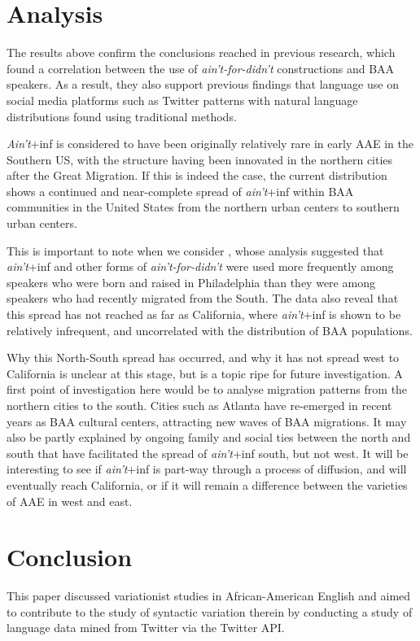 \documentclass[output=paper,colorlinks,citecolor=brown,draftmode]{langscibook}
\begin{document}
\section{Analysis}
The results above confirm the conclusions reached in previous research, which found a correlation between the use of \textit{ain’t-for-didn’t} constructions and BAA speakers. As a result, they also support previous findings \citep{eisenstein2013,jones2015,willis2020} that language use on social media platforms such as Twitter patterns with natural language distributions found using traditional methods.

\textit{Ain't}+inf is considered to have been originally relatively rare in early AAE in the Southern US, with the structure having been innovated in the northern cities after the Great Migration. If this is indeed the case, the current distribution shows a continued and near-complete spread of \textit{ain't}+inf within BAA communities in the United States from the northern urban centers to southern urban centers. 

This is important to note when we consider \citet{fisher2022}, whose analysis suggested that \textit{ain't}+inf and other forms of \textit{ain't-for-didn’t} were used more frequently among speakers who were born and raised in Philadelphia than they were among speakers who had recently migrated from the South. The data also reveal that this spread has not reached as far as California, where \textit{ain't}+inf is shown to be relatively infrequent, and uncorrelated with the distribution of BAA populations.

Why this North-South spread has occurred, and why it has not spread west to California is unclear at this stage, but is a topic ripe for future investigation. A first point of investigation here would be to analyse migration patterns from the northern cities to the south. Cities such as Atlanta have re-emerged in recent years as BAA cultural centers, attracting new waves of BAA migrations. It may also be partly explained by ongoing family and social ties between the north and south that have facilitated the spread of \textit{ain't}+inf south, but not west. It will be interesting to see if \textit{ain't}+inf is part-way through a process of diffusion, and will eventually reach California, or if it will remain a difference between the varieties of AAE in west and east.


\section{Conclusion}
This paper discussed variationist studies in African-American English and aimed to contribute to the study of syntactic variation therein by conducting a study of language data mined from Twitter via the Twitter API. 
\end{document}
